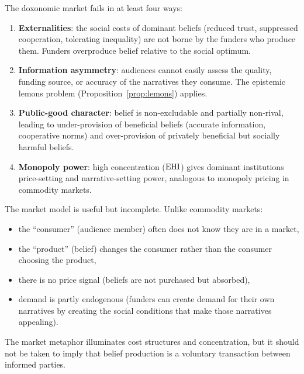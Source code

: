\begin{proposition}
\label{prop:market-failure}
The doxonomic market fails in at least four ways:
\begin{enumerate}[nosep]
  \item \textbf{Externalities}: the social costs of dominant beliefs (reduced trust, suppressed cooperation, tolerating inequality) are not borne by the funders who produce them.
  Funders overproduce belief relative to the social optimum.
  \item \textbf{Information asymmetry}: audiences cannot easily assess the quality, funding source, or accuracy of the narratives they consume.
  The epistemic lemons problem (Proposition~\ref{prop:lemons}) applies.
  \item \textbf{Public-good character}: belief is non-excludable and partially non-rival, leading to under-provision of beneficial beliefs (accurate information, cooperative norms) and over-provision of privately beneficial but socially harmful beliefs.
  \item \textbf{Monopoly power}: high concentration ($\mathrm{EHI}$) gives dominant institutions price-setting and narrative-setting power, analogous to monopoly pricing in commodity markets.
\end{enumerate}
\end{proposition}

\begin{remark}
\label{rem:market-imperfect}
The market model is useful but incomplete.
Unlike commodity markets:
\begin{itemize}[nosep]
  \item the ``consumer'' (audience member) often does not know they are in a market,
  \item the ``product'' (belief) changes the consumer rather than the consumer choosing the product,
  \item there is no price signal (beliefs are not purchased but absorbed),
  \item demand is partly endogenous (funders can create demand for their own narratives by creating the social conditions that make those narratives appealing).
\end{itemize}
The market metaphor illuminates cost structures and concentration, but it should not be taken to imply that belief production is a voluntary transaction between informed parties.
\end{remark}


